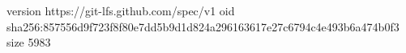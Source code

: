version https://git-lfs.github.com/spec/v1
oid sha256:857556d9f723f8f80e7dd5b9d1d824a296163617e27c6794c4e493b6a474b0f3
size 5983
